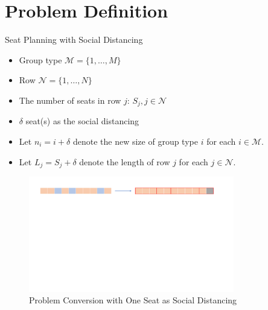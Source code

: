 
\section{Problem Definition}
    \frame{\sectionpage}

    \begin{frame}{Seat Planning with Social Distancing}
      \begin{itemize}
      \item Group type $\mathcal{M} = \{1, \ldots, M\}$
      \item Row $\mathcal{N} = \{1, \ldots, N\}$
      \item The number of seats in row $j$: $S_j, j \in \mathcal{N}$
      \item $\delta$ seat(s) as the social distancing
      \item Let $n_i = i + \delta$ denote the new size of group type $i$ for each $i \in \mathcal{M}$.
      \item Let $L_j = S_j + \delta$ denote the length of row $j$ for each $j \in \mathcal{N}$.
      \end{itemize}
      
      \begin{figure}[ht]
        \centering
        \includegraphics[width = 0.8\textwidth]{./images/dummy_seat.pdf}
        \caption{Problem Conversion with One Seat as Social Distancing}
    \end{figure}
    \end{frame}

